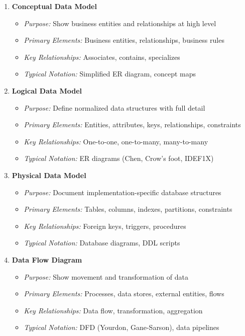 \documentclass[11pt,letterpaper]{article}
\begin{document}
\begin{enumerate}[label=\textbf{MT\arabic*:}, leftmargin=2.5em]
    \item \textbf{Conceptual Data Model}
    \begin{itemize}[nosep]
        \item \textit{Purpose:} Show business entities and relationships at high level
        \item \textit{Primary Elements:} Business entities, relationships, business rules
        \item \textit{Key Relationships:} Associates, contains, specializes
        \item \textit{Typical Notation:} Simplified ER diagram, concept maps
    \end{itemize}
    
    \item \textbf{Logical Data Model}
    \begin{itemize}[nosep]
        \item \textit{Purpose:} Define normalized data structures with full detail
        \item \textit{Primary Elements:} Entities, attributes, keys, relationships, constraints
        \item \textit{Key Relationships:} One-to-one, one-to-many, many-to-many
        \item \textit{Typical Notation:} ER diagrams (Chen, Crow's foot, IDEF1X)
    \end{itemize}
    
    \item \textbf{Physical Data Model}
    \begin{itemize}[nosep]
        \item \textit{Purpose:} Document implementation-specific database structures
        \item \textit{Primary Elements:} Tables, columns, indexes, partitions, constraints
        \item \textit{Key Relationships:} Foreign keys, triggers, procedures
        \item \textit{Typical Notation:} Database diagrams, DDL scripts
    \end{itemize}
    
    \item \textbf{Data Flow Diagram}
    \begin{itemize}[nosep]
        \item \textit{Purpose:} Show movement and transformation of data
        \item \textit{Primary Elements:} Processes, data stores, external entities, flows
        \item \textit{Key Relationships:} Data flow, transformation, aggregation
        \item \textit{Typical Notation:} DFD (Yourdon, Gane-Sarson), data pipelines
    \end{itemize}
    

\end{enumerate}
\end{document}
